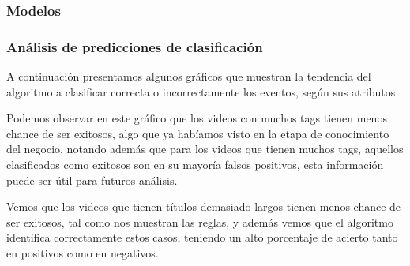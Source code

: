     \subsubsection{Modelos}

        \def\RUN{1}
        \def\title{Resultados de la corrida 1 del arbol de decisión J48}
        \def\algorithm{weka}
        \def\numberOfRules{17}
        \def\hasRules{1}
        
        \newpage

        \def\RUN{2}
        \def\title{Resultados de la corrida 2 del arbol de decisión J48}
        \def\algorithm{weka}
        \def\numberOfRules{20}
        \def\hasRules{1}
        
        \newpage

        \def\RUN{1}
        \def\title{Resultados de la corrida de Perceptron}
        \def\algorithm{perceptron}
        \def\numberOfRules{20}
        \def\hasRules{0}
        

    \subsubsection{Análisis de predicciones de clasificación}

        A continuación presentamos algunos gráficos que muestran la tendencia
        del algoritmo a clasificar correcta o incorrectamente los eventos, según
        sus atributos

        \def\path{clasif_error_tags_length.png}
        \def\text{Clasif. Errors vs tag length}
        

        Podemos observar en este gráfico que los videos con muchos tags tienen
        menos chance de ser exitosos, algo que ya habíamos visto en la etapa de
        conocimiento del negocio, notando además que para los videos que tienen
        muchos tags, aquellos clasificados como exitosos son en su mayoría
        falsos positivos, esta información puede ser útil para futuros análisis.

        \def\path{clasif_error_title_length.png}
        \def\text{Clasif. errors vs title length}
        

        Vemos que los videos que tienen títulos demasiado largos tienen menos
        chance de ser exitosos, tal como nos muestran las reglas, y además vemos
        que el algoritmo identifica correctamente estos casos, teniendo un alto
        porcentaje de acierto tanto en positivos como en negativos.

